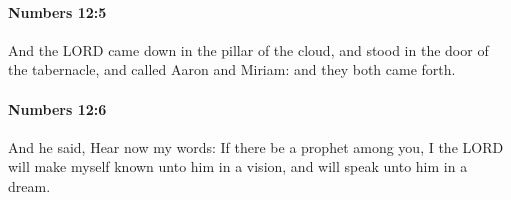 		\paragraph{Numbers 12:5} %
			\label{NUMBERS-12-5}

			And the LORD came down in the pillar of the cloud, and stood in the door of the tabernacle, and called Aaron and Miriam: and they both came forth.


		\paragraph{Numbers 12:6} %
			\label{NUMBERS-12-6}

			And he said, Hear now my words: If there be a prophet among you, I the LORD will make myself known unto him in a vision, and will speak unto him in a dream.


